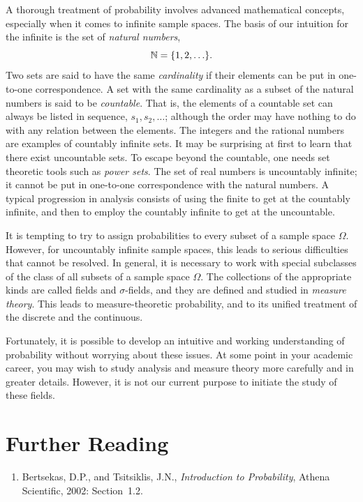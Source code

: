 A thorough treatment of probability involves advanced mathematical concepts, especially when it comes to infinite sample spaces.
The basis of our intuition for the infinite is the set of \emph{natural numbers},
\begin{equation*}
\mathbb{N} = \{ 1, 2, \ldots \}.
\end{equation*}
Two sets are said to have the same \emph{cardinality} if their elements can be put in one-to-one correspondence.
A set with the same cardinality as a subset of the natural numbers is said to be \emph{countable}.
That is, the elements of a countable set can always be listed in sequence, $s_1, s_2, \ldots$; although the order may have nothing to do with any relation between the elements.
The integers and the rational numbers are examples of countably infinite sets.
It may be surprising at first to learn that there exist uncountable sets.
To escape beyond the countable, one needs set theoretic tools such as \emph{power sets}.
The set of real numbers is uncountably infinite; it cannot be put in one-to-one correspondence with the natural numbers.
A typical progression in analysis consists of using the finite to get at the countably infinite, and then to employ the countably infinite to get at the uncountable.

It is tempting to try to assign probabilities to every subset of a sample space $\Omega$.
However, for uncountably infinite sample spaces, this leads to serious difficulties that cannot be resolved.
In general, it is necessary to work with special subclasses of the class of all subsets of a sample space $\Omega$.
The collections of the appropriate kinds are called fields and $\sigma$-fields, and they are defined and studied in \emph{measure theory}.
This leads to measure-theoretic probability, and to its unified treatment of the discrete and the continuous.

Fortunately, it is possible to develop an intuitive and working understanding of probability without worrying about these issues.
At some point in your academic career, you may wish to study analysis and measure theory more carefully and in greater details.
However, it is not our current purpose to initiate the study of these fields.


\section*{Further Reading}

\begin{small}
\begin{enumerate}
\item Bertsekas, D.P., and Tsitsiklis, J.N., \emph{Introduction to Probability}, Athena Scientific, 2002: Section~1.2.
\end{enumerate}
\end{small}

